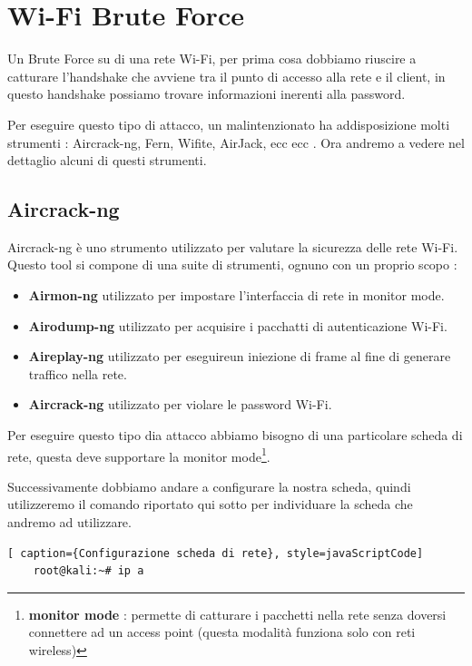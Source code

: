 \chapter{Wi-Fi Brute Force}

Un Brute Force su di una rete Wi-Fi, per prima cosa dobbiamo riuscire a catturare l'handshake che avviene tra il punto di accesso alla rete e il client, in questo handshake possiamo trovare informazioni inerenti alla password.

Per eseguire questo tipo di attacco, un malintenzionato ha addisposizione molti strumenti : Aircrack-ng, Fern, Wifite, AirJack, ecc ecc . Ora andremo a vedere nel dettaglio alcuni di questi strumenti.

\section{Aircrack-ng}

Aircrack-ng\cite{aircrack} è uno strumento utilizzato per valutare la sicurezza delle rete Wi-Fi. Questo tool si compone di una suite di strumenti, ognuno con un proprio scopo :
\begin{itemize}
    \item \textbf{Airmon-ng} utilizzato per impostare l'interfaccia di rete in monitor mode. 
    \item \textbf{Airodump-ng} utilizzato per acquisire i pacchatti di autenticazione Wi-Fi.
    \item \textbf{Aireplay-ng} utilizzato per eseguireun iniezione di frame al fine di generare traffico nella rete.
    \item \textbf{Aircrack-ng} utilizzato per violare le password Wi-Fi.
\end{itemize}

Per eseguire questo tipo dia attacco abbiamo bisogno di una particolare scheda di rete, questa deve supportare la monitor mode\footnote[1]{\textbf{monitor mode} : permette di catturare i pacchetti nella rete senza doversi connettere ad un access point (questa modalità funziona solo con reti wireless)}.

Successivamente dobbiamo andare a configurare la nostra scheda, quindi utilizzeremo il comando riportato qui sotto per individuare la scheda che andremo ad utilizzare.

\begin{lstlisting}[ caption={Configurazione scheda di rete}, style=javaScriptCode]
	root@kali:~# ip a
\end{lstlisting}


